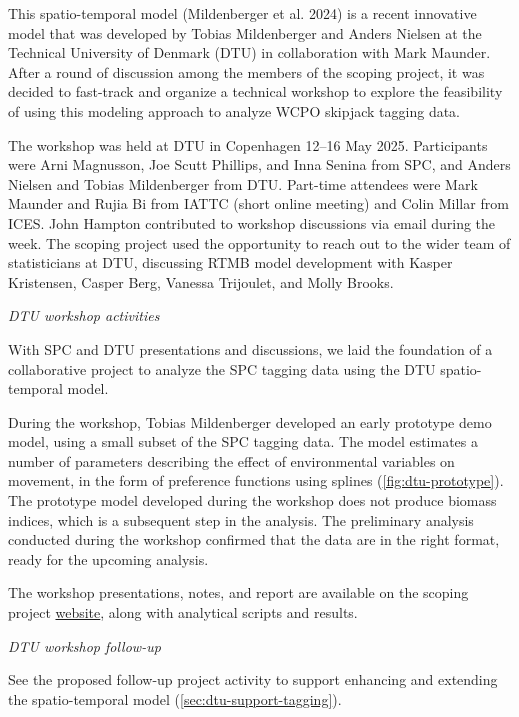 \documentclass{SCreport}
\newcommand\tree
{https://github.com/PacificCommunity/ofp-sam-transition-plan/tree/main}
\begin{document}
This spatio-temporal model (Mildenberger et al. 2024) is a recent innovative
model that was developed by Tobias Mildenberger and Anders Nielsen at the
Technical University of Denmark (DTU) in collaboration with Mark Maunder. After
a round of discussion among the members of the scoping project, it was decided
to fast-track and organize a technical workshop to explore the feasibility of
using this modeling approach to analyze WCPO skipjack tagging data.

The workshop was held at DTU in Copenhagen 12--16 May 2025. Participants were
Arni Magnusson, Joe Scutt Phillips, and Inna Senina from SPC, and Anders Nielsen
and Tobias Mildenberger from DTU. Part-time attendees were Mark Maunder and
Rujia Bi from IATTC (short online meeting) and Colin Millar from ICES. John
Hampton contributed to workshop discussions via email during the week. The
scoping project used the opportunity to reach out to the wider team of
statisticians at DTU, discussing RTMB model development with Kasper Kristensen,
Casper Berg, Vanessa Trijoulet, and Molly Brooks.

\vspace{2ex}

\textit{DTU workshop activities}

With SPC and DTU presentations and discussions, we laid the foundation of a
collaborative project to analyze the SPC tagging data using the DTU
spatio-temporal model.

During the workshop, Tobias Mildenberger developed an early prototype demo
model, using a small subset of the SPC tagging data. The model estimates a
number of parameters describing the effect of environmental variables on
movement, in the form of preference functions using splines
(\autoref{fig:dtu-prototype}). The prototype model developed during the workshop
does not produce biomass indices, which is a subsequent step in the analysis.
The preliminary analysis conducted during the workshop confirmed that the data
are in the right format, ready for the upcoming analysis.

The workshop presentations, notes, and report are available on the scoping
project \href{\tree/workshops/2025-05-copenhagen}{website}, along with
analytical scripts and results.

\vspace{2ex}

\textit{DTU workshop follow-up}

See the proposed follow-up project activity to support enhancing and extending
the spatio-temporal model (\autoref{sec:dtu-support-tagging}).
\end{document}
